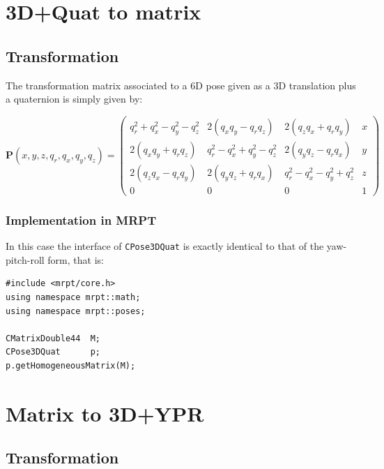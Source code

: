 \documentclass[a4paper,10pt]{report}
\begin{document}
\section{3D+Quat to matrix }
\label{sect:quat2mat}

\subsection{Transformation}

The transformation matrix associated to a 6D pose given as a 3D translation plus 
a quaternion is simply given by:

\begin{equation}
\mathbf{P}(x,y,z,q_r,q_x,q_y,q_z)=\left(
  \begin{array}{ccc|c}
   q_r^2+q_x^2-q_y^2-q_z^2 	&  2(q_x q_y - q_r q_z)	&  	2(q_z q_x+q_r q_y)  & x \\
   2(q_x q_y+q_r q_z) 		& q_r^2-q_x^2+q_y^2-q_z^2 	& 2(q_y q_z-q_r q_x) 	& y \\
   2(q_z q_x-q_r q_y) & 2(q_y q_z+q_r q_x)  & q_r^2- q_x^2 - q_y^2 + q_z^2 & z \\ \hline
   0 & 0 & 0& 1
  \end{array}
\right)
\end{equation}



\subsubsection{Implementation in MRPT}

In this case the interface of \texttt{CPose3DQuat} is exactly identical to that 
of the yaw-pitch-roll form, that is:

\begin{lstlisting}
#include <mrpt/core.h> 
using namespace mrpt::math; 
using namespace mrpt::poses; 

CMatrixDouble44  M;
CPose3DQuat      p;
p.getHomogeneousMatrix(M);
\end{lstlisting}




\section{Matrix to 3D+YPR   }
\label{sect:mat2ypr}

\subsection{Transformation}
\end{document}
